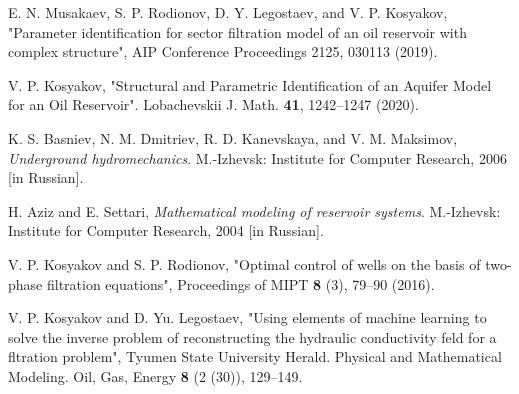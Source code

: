 \documentclass[
11pt,%
tightenlines,%
twoside,%
onecolumn,%
nofloats,%
nobibnotes,%
nofootinbib,%
superscriptaddress,%
noshowpacs,%
centertags]%
{revtex4}
\begin{document}
\begin{thebibliography}{20}


 E. N. Musakaev, S. P. Rodionov, D. Y. Legostaev, and V. P. Kosyakov,
 "Parameter identification for sector filtration model of an oil reservoir with complex structure",
 AIP Conference Proceedings 2125, 030113 (2019).

 V. P. Kosyakov, "Structural and Parametric Identification
of an Aquifer Model for an Oil Reservoir". Lobachevskii J. Math.
{\bf 41}, 1242--1247 (2020).

 K. S. Basniev, N. M. Dmitriev, R. D. Kanevskaya, and V. M. Maksimov,
\textit{Underground hydromechanics}. M.-Izhevsk: Institute for
Computer Research, 2006 [in Russian].

 H. Aziz and E. Settari, \textit{Mathematical modeling of reservoir systems}.
 M.-Izhevsk: Institute for Computer Research, 2004 [in Russian].

 V. P. Kosyakov and S. P. Rodionov, "Optimal control of wells on the basis
of two-phase filtration equations", Proceedings of MIPT {\bf 8} (3),
79--90 (2016).

 V. P. Kosyakov and  D. Yu. Legostaev, "Using elements of machine learning to
solve the inverse problem of reconstructing the hydraulic 
conductivity feld for a fltration problem", Tyumen State University
Herald. Physical and Mathematical Modeling. Oil, Gas, Energy {\bf 8}
(2 (30)), 129--149.

\end{thebibliography}
\end{document}
